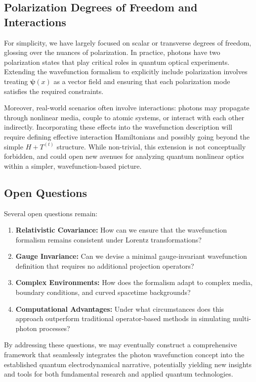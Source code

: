 \documentclass[aps,prl,twocolumn,showpacs,showkeys,superscriptaddress,amsmath,amssymb]{revtex4-2}
\begin{document}
\subsection{Polarization Degrees of Freedom and Interactions}

For simplicity, we have largely focused on scalar or transverse degrees of freedom, glossing over the nuances of polarization. In practice, photons have two polarization states that play critical roles in quantum optical experiments. Extending the wavefunction formalism to explicitly include polarization involves treating $\bm{\psi}(x)$ as a vector field and ensuring that each polarization mode satisfies the required constraints.

Moreover, real-world scenarios often involve interactions: photons may propagate through nonlinear media, couple to atomic systems, or interact with each other indirectly. Incorporating these effects into the wavefunction description will require defining effective interaction Hamiltonians and possibly going beyond the simple $H + T^{(t)}$ structure. While non-trivial, this extension is not conceptually forbidden, and could open new avenues for analyzing quantum nonlinear optics within a simpler, wavefunction-based picture.

\subsection{Open Questions}

Several open questions remain:
\begin{enumerate}
    \item \textbf{Relativistic Covariance:} How can we ensure that the wavefunction formalism remains consistent under Lorentz transformations?
    \item \textbf{Gauge Invariance:} Can we devise a minimal gauge-invariant wavefunction definition that requires no additional projection operators?
    \item \textbf{Complex Environments:} How does the formalism adapt to complex media, boundary conditions, and curved spacetime backgrounds?
    \item \textbf{Computational Advantages:} Under what circumstances does this approach outperform traditional operator-based methods in simulating multi-photon processes?
\end{enumerate}

By addressing these questions, we may eventually construct a comprehensive framework that seamlessly integrates the photon wavefunction concept into the established quantum electrodynamical narrative, potentially yielding new insights and tools for both fundamental research and applied quantum technologies.
\end{document}
